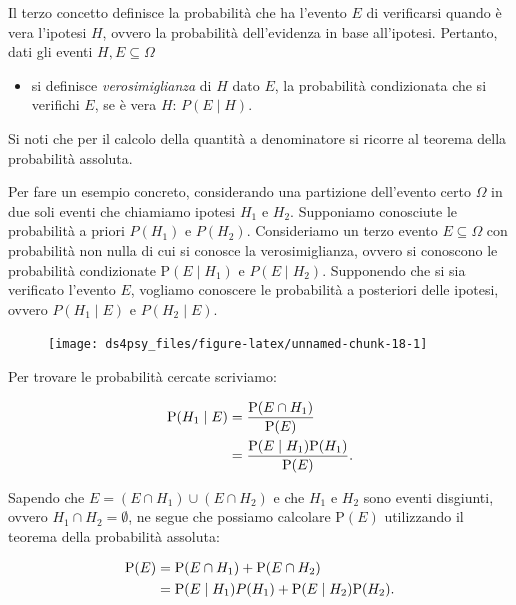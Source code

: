 \documentclass[
  11pt,
]{krantz}
\providecommand{\tightlist}{%
  \setlength{\itemsep}{0pt}\setlength{\parskip}{0pt}}
\theoremstyle{definition}
\theoremstyle{definition}
\theoremstyle{definition}
\theoremstyle{definition}
\theoremstyle{remark}
\begin{document}
Il terzo concetto definisce la probabilità che ha l'evento \(E\) di verificarsi quando è vera l'ipotesi \(H\), ovvero la probabilità dell'evidenza in base all'ipotesi. Pertanto, dati gli eventi \(H, E \subseteq \Omega\)

\begin{itemize}
\tightlist
\item
  si definisce \emph{verosimiglianza} di \(H\) dato \(E\), la probabilità condizionata che si verifichi \(E\), se è vera \(H\): \(P (E \mid H)\).
\end{itemize}

Si noti che per il calcolo della quantità a denominatore si ricorre al teorema della probabilità assoluta.

Per fare un esempio concreto, considerando una partizione dell'evento certo \(\Omega\) in due soli eventi che chiamiamo ipotesi \(H_1\) e \(H_2\). Supponiamo conosciute le probabilità a priori \(P(H_1)\) e \(P(H_2)\). Consideriamo un terzo evento \(E \subseteq \Omega\) con probabilità non nulla di cui si conosce la verosimiglianza, ovvero si conoscono le probabilità condizionate \({\mbox{P}}(E \mid H_1)\) e \(P(E \mid H_2)\). Supponendo che si sia verificato l'evento \(E\), vogliamo conoscere le probabilità a posteriori delle ipotesi, ovvero \(P(H_1 \mid E)\) e \(P(H_2 \mid E)\).

\begin{figure}

{\centering \texttt{[image: ds4psy\_files/figure-latex/unnamed-chunk-18-1]} 

}

\end{figure}

Per trovare le probabilità cercate scriviamo:

\[
\begin{split}
{\mbox{P}}(H_1 \mid E) &= \frac{{\mbox{P}}(E \cap H_1)}{{\mbox{P}}(E)}\notag\\
              &= \frac{{\mbox{P}}(E \mid H_1){\mbox{P}}(H_1)}{{\mbox{P}}(E)}.
\end{split}
\]

Sapendo che \(E = (E \cap H_1) \cup (E \cap H_2)\) e che \(H_1\) e \(H_2\) sono eventi disgiunti, ovvero \(H_1 \cap H_2 = \emptyset\), ne segue che possiamo calcolare \({\mbox{P}}(E)\) utilizzando il teorema della probabilità assoluta:

\[
\begin{split}
{\mbox{P}}(E) &= {\mbox{P}}(E \cap H_1) + {\mbox{P}}(E \cap H_2)\notag\\
     &= {\mbox{P}}(E \mid H_1)P(H_1) + {\mbox{P}}(E \mid H_2){\mbox{P}}(H_2).
\end{split}
\]
\end{document}
